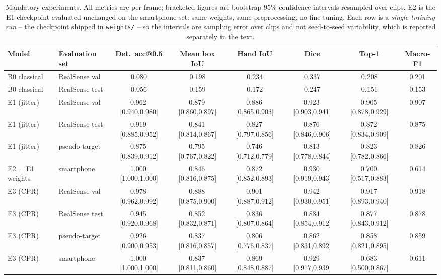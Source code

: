 \begin{table}[t]
\centering
\caption{Mandatory experiments. All metrics are per-frame; bracketed figures are bootstrap 95\% confidence intervals resampled over clips. E2 is the E1 checkpoint evaluated unchanged on the smartphone set: same weights, same preprocessing, no fine-tuning. Each row is a \emph{single training run} -- the checkpoint shipped in \texttt{weights/} -- so the intervals are sampling error over clips and not seed-to-seed variability, which is reported separately in the text.}
\label{tab:main}
\begin{tabular}{llcccccc}
\toprule
Model & Evaluation set & Det.\ acc@0.5 & Mean box IoU & Hand IoU & Dice & Top-1 & Macro-F1 \\
\midrule
B0 classical & RealSense val & 0.080 & 0.198 & 0.234 & 0.337 & 0.208 & 0.201 \\
B0 classical & RealSense test & 0.056 & 0.159 & 0.172 & 0.247 & 0.151 & 0.153 \\
E1 (jitter) & RealSense val & 0.962\,\tiny[0.940,0.980] & 0.879\,\tiny[0.860,0.897] & 0.886\,\tiny[0.865,0.903] & 0.923\,\tiny[0.903,0.941] & 0.905\,\tiny[0.878,0.929] & 0.907 \\
E1 (jitter) & RealSense test & 0.919\,\tiny[0.885,0.952] & 0.841\,\tiny[0.814,0.867] & 0.827\,\tiny[0.797,0.856] & 0.876\,\tiny[0.846,0.906] & 0.872\,\tiny[0.834,0.909] & 0.875 \\
E1 (jitter) & pseudo-target & 0.875\,\tiny[0.839,0.912] & 0.795\,\tiny[0.767,0.822] & 0.746\,\tiny[0.712,0.779] & 0.813\,\tiny[0.778,0.844] & 0.823\,\tiny[0.782,0.866] & 0.826 \\
E2 = E1 weights & smartphone & 1.000\,\tiny[1.000,1.000] & 0.846\,\tiny[0.816,0.875] & 0.872\,\tiny[0.852,0.893] & 0.930\,\tiny[0.919,0.943] & 0.700\,\tiny[0.517,0.883] & 0.614 \\
E3 (CPR) & RealSense val & 0.978\,\tiny[0.962,0.992] & 0.888\,\tiny[0.875,0.900] & 0.901\,\tiny[0.887,0.912] & 0.942\,\tiny[0.930,0.951] & 0.917\,\tiny[0.893,0.940] & 0.918 \\
E3 (CPR) & RealSense test & 0.945\,\tiny[0.920,0.968] & 0.852\,\tiny[0.832,0.871] & 0.836\,\tiny[0.807,0.864] & 0.884\,\tiny[0.854,0.912] & 0.877\,\tiny[0.843,0.912] & 0.878 \\
E3 (CPR) & pseudo-target & 0.926\,\tiny[0.900,0.953] & 0.837\,\tiny[0.816,0.857] & 0.806\,\tiny[0.776,0.837] & 0.862\,\tiny[0.831,0.892] & 0.858\,\tiny[0.821,0.895] & 0.859 \\
E3 (CPR) & smartphone & 1.000\,\tiny[1.000,1.000] & 0.837\,\tiny[0.811,0.860] & 0.869\,\tiny[0.848,0.887] & 0.929\,\tiny[0.917,0.939] & 0.683\,\tiny[0.500,0.867] & 0.611 \\
\bottomrule
\end{tabular}
\end{table}
